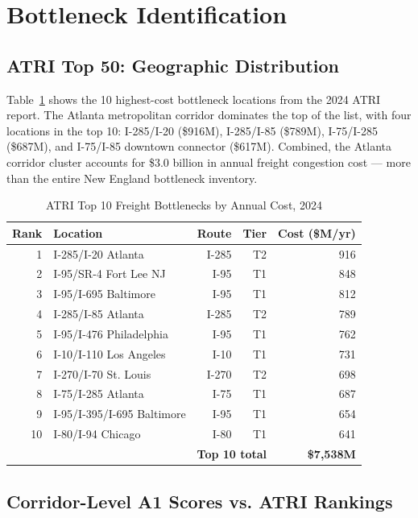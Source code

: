 \section{Bottleneck Identification}

\subsection{ATRI Top 50: Geographic Distribution}

Table~\ref{tab:atri-top10} shows the 10 highest-cost bottleneck locations from the 2024 ATRI report. The Atlanta metropolitan corridor dominates the top of the list, with four locations in the top 10: I-285/I-20 (\$916M), I-285/I-85 (\$789M), I-75/I-285 (\$687M), and I-75/I-85 downtown connector (\$617M). Combined, the Atlanta corridor cluster accounts for \$3.0 billion in annual freight congestion cost --- more than the entire New England bottleneck inventory.

\begin{table}[h!]
\centering
\caption{ATRI Top 10 Freight Bottlenecks by Annual Cost, 2024}
\label{tab:atri-top10}
\begin{tabular}{rlrrr}
\toprule
\textbf{Rank} & \textbf{Location} & \textbf{Route} & \textbf{Tier} & \textbf{Cost (\$M/yr)} \\
\midrule
1 & I-285/I-20 Atlanta & I-285 & T2 & 916 \\
2 & I-95/SR-4 Fort Lee NJ & I-95 & T1 & 848 \\
3 & I-95/I-695 Baltimore & I-95 & T1 & 812 \\
4 & I-285/I-85 Atlanta & I-285 & T2 & 789 \\
5 & I-95/I-476 Philadelphia & I-95 & T1 & 762 \\
6 & I-10/I-110 Los Angeles & I-10 & T1 & 731 \\
7 & I-270/I-70 St. Louis & I-270 & T2 & 698 \\
8 & I-75/I-285 Atlanta & I-75 & T1 & 687 \\
9 & I-95/I-395/I-695 Baltimore & I-95 & T1 & 654 \\
10 & I-80/I-94 Chicago & I-80 & T1 & 641 \\
\midrule
\multicolumn{4}{r}{\textbf{Top 10 total}} & \textbf{\$7,538M} \\
\bottomrule
\end{tabular}
\end{table}

\subsection{Corridor-Level A1 Scores vs. ATRI Rankings}

